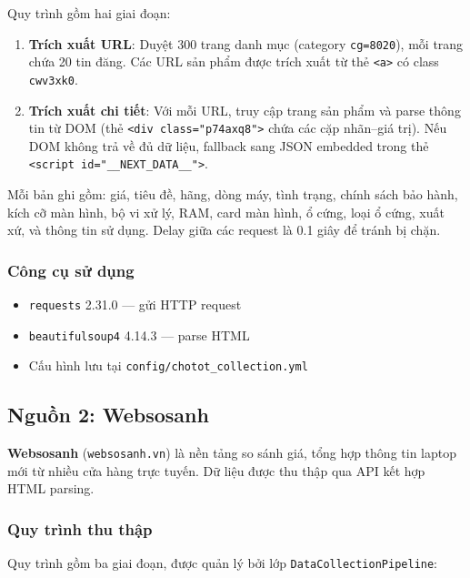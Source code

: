 Quy trình gồm hai giai đoạn:

\begin{enumerate}[noitemsep]
    \item \textbf{Trích xuất URL}: Duyệt 300 trang danh mục (category \texttt{cg=8020}), mỗi trang chứa 20 tin đăng. Các URL sản phẩm được trích xuất từ thẻ \texttt{<a>} có class \texttt{cwv3xk0}.
    \item \textbf{Trích xuất chi tiết}: Với mỗi URL, truy cập trang sản phẩm và parse thông tin từ DOM (thẻ \texttt{<div class="p74axq8">} chứa các cặp nhãn--giá trị). Nếu DOM không trả về đủ dữ liệu, fallback sang JSON embedded trong thẻ \texttt{<script id="\_\_NEXT\_DATA\_\_">}.
\end{enumerate}

Mỗi bản ghi gồm: giá, tiêu đề, hãng, dòng máy, tình trạng, chính sách bảo hành, kích cỡ màn hình, bộ vi xử lý, RAM, card màn hình, ổ cứng, loại ổ cứng, xuất xứ, và thông tin sử dụng. Delay giữa các request là 0.1 giây để tránh bị chặn.

\subsubsection{Công cụ sử dụng}

\begin{itemize}[noitemsep]
    \item \texttt{requests} 2.31.0 --- gửi HTTP request
    \item \texttt{beautifulsoup4} 4.14.3 --- parse HTML
    \item Cấu hình lưu tại \texttt{config/chotot\_collection.yml}
\end{itemize}

\subsection{Nguồn 2: Websosanh}
\label{subsec:websosanh-collection}

\textbf{Websosanh} (\texttt{websosanh.vn}) là nền tảng so sánh giá, tổng hợp thông tin laptop mới từ nhiều cửa hàng trực tuyến. Dữ liệu được thu thập qua API kết hợp HTML parsing.

\subsubsection{Quy trình thu thập}

Quy trình gồm ba giai đoạn, được quản lý bởi lớp \texttt{DataCollectionPipeline}:

